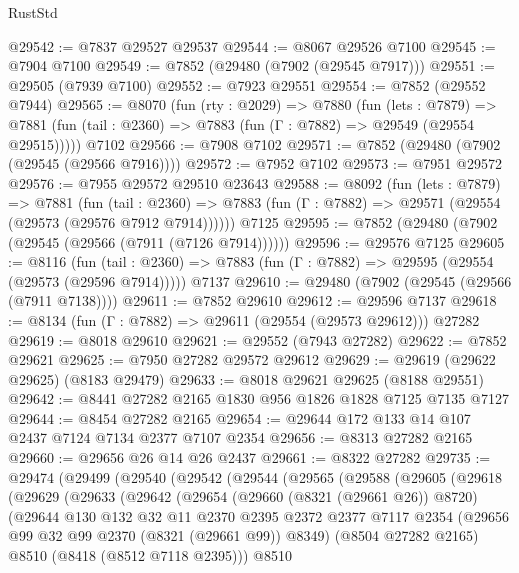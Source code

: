 \begin{lexlean}{RustStd}
\begin{coremodule}
@29542 := @7837 @29527 @29537
@29544 := @8067 @29526 @7100
@29545 := @7904 @7100
@29549 := @7852 (@29480 (@7902 (@29545 @7917)))
@29551 := @29505 (@7939 @7100)
@29552 := @7923 @29551
@29554 := @7852 (@29552 @7944)
@29565 := @8070
    (fun (rty : @2029) =>
    @7880
      (fun (lets : @7879) =>
      @7881 (fun (tail : @2360) => @7883 (fun (Γ : @7882) => @29549 (@29554 @29515)))))
    @7102
@29566 := @7908 @7102
@29571 := @7852 (@29480 (@7902 (@29545 (@29566 @7916))))
@29572 := @7952 @7102
@29573 := @7951 @29572
@29576 := @7955 @29572 @29510 @23643
@29588 := @8092
    (fun (lets : @7879) =>
    @7881
      (fun (tail : @2360) =>
      @7883 (fun (Γ : @7882) => @29571 (@29554 (@29573 (@29576 @7912 @7914))))))
    @7125
@29595 := @7852 (@29480 (@7902 (@29545 (@29566 (@7911 (@7126 @7914))))))
@29596 := @29576 @7125
@29605 := @8116
    (fun (tail : @2360) => @7883 (fun (Γ : @7882) => @29595 (@29554 (@29573 (@29596 @7914)))))
    @7137
@29610 := @29480 (@7902 (@29545 (@29566 (@7911 @7138))))
@29611 := @7852 @29610
@29612 := @29596 @7137
@29618 := @8134 (fun (Γ : @7882) => @29611 (@29554 (@29573 @29612))) @27282
@29619 := @8018 @29610
@29621 := @29552 (@7943 @27282)
@29622 := @7852 @29621
@29625 := @7950 @27282 @29572 @29612
@29629 := @29619 (@29622 @29625) (@8183 @29479)
@29633 := @8018 @29621 @29625 (@8188 @29551)
@29642 := @8441 @27282 @2165 @1830 @956 @1826 @1828 @7125 @7135 @7127
@29644 := @8454 @27282 @2165
@29654 := @29644 @172 @133 @14 @107 @2437 @7124 @7134 @2377 @7107 @2354
@29656 := @8313 @27282 @2165
@29660 := @29656 @26 @14 @26 @2437
@29661 := @8322 @27282
@29735 := @29474
    (@29499
      (@29540
        (@29542
          (@29544
            (@29565
              (@29588
                (@29605
                  (@29618
                    (@29629
                      (@29633
                        (@29642
                          (@29654
                            (@29660 (@8321 (@29661 @26)) @8720)
                            (@29644
                              @130
                              @132
                              @32
                              @11
                              @2370
                              @2395
                              @2372
                              @2377
                              @7117
                              @2354
                              (@29656 @99 @32 @99 @2370 (@8321 (@29661 @99)) @8349)
                              (@8504 @27282 @2165)
                              @8510
                              (@8418 (@8512 @7118 @2395)))
                            @8510

\end{coremodule}
\end{lexlean}

